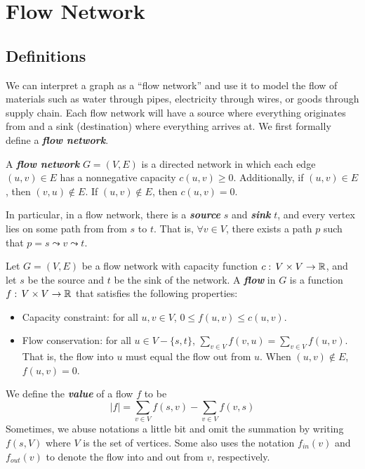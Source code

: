 \section{Flow Network}

\subsection{Definitions}

We can interpret a graph as a ``flow network'' and use it to model the flow of materials such as water through pipes, electricity through wires, or goods through supply chain. Each flow network will have a source where everything originates from and a sink (destination) where everything arrives at. We first formally define a \textit{\textbf{flow network}}.

\begin{definition}   
    A \textit{\textbf{flow network}} $G=(V,E)$ is a directed network in which each edge $(u,v) \in E$ has a nonnegative capacity $c(u,v) \geq 0$. Additionally, if $(u,v) \in E$, then $(v,u) \not\in E$. If $(u,v) \not\in E$, then $c(u,v) = 0$.

    In particular, in a flow network, there is a \textit{\textbf{source}} $s$ and \textit{\textbf{sink}} $t$, and every vertex lies on some path from from $s$ to $t$. That is, $\forall v \in V$, there exists a path $p$ such that $p = s \leadsto v \leadsto t$.
\end{definition}

\begin{definition}[Flow] 
    Let $G=(V,E)$ be a flow network with capacity function $c:\, V\times V \to \mathbb{R}$, and let $s$ be the source and $t$ be the sink of the network. A \textit{\textbf{flow}} in $G$ is a function $f:\, V\times V \to \mathbb{R}$ that satisfies the following properties:
    \begin{itemize}
        \item Capacity constraint: for all $u,v \in V$, $0 \leq f(u,v) \leq c(u,v)$.
        \item Flow conservation: for all $u \in V - \{s,t\}$, $\sum_{v \in V} f(v,u) = \sum_{v \in V} f(u,v)$. That is, the flow into $u$ must equal the flow out from $u$. When $(u,v) \not\in E$, $f(u,v) = 0$.
    \end{itemize}
    We define the \textit{\textbf{value}} of a flow $f$ to be
    $$
    |f| = \sum_{v\in V} f(s,v) - \sum_{v \in V} f(v,s)
    $$
    Sometimes, we abuse notations a little bit and omit the summation by writing $f(s,V)$ where $V$ is the set of vertices. Some also uses the notation $f_{in}(v)$ and $f_{out}(v)$ to denote the flow into and out from $v$, respectively.
\end{definition}

